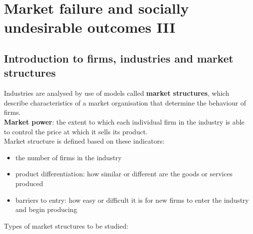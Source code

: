 \documentclass[a4paper,12pt]{article}
\newcommand{\needbold}[1]{\textcolor{red!70!black}{\textbf{#1}}}
\begin{document}
\section{Market failure and socially undesirable outcomes III}
\subsection{Introduction to firms, industries and market structures}
Industries are analysed by use of models called \needbold{market structures}, which describe characteristics of a market organisation that determine the behaviour of firms.
\\\needbold{Market power}: the extent to which each individual firm in the industry is able to control the price at which it sells its product.\\
Market structure is defined based on these indicators:
\begin{itemize}
  \item the number of firms in the industry
  \item product differentiation: how similar or different are the goods or services produced
  \item barriers to entry: how easy or difficult it is for new firms to enter the industry and begin producing
\end{itemize}
Types of market structures to be studied:
\end{document}
